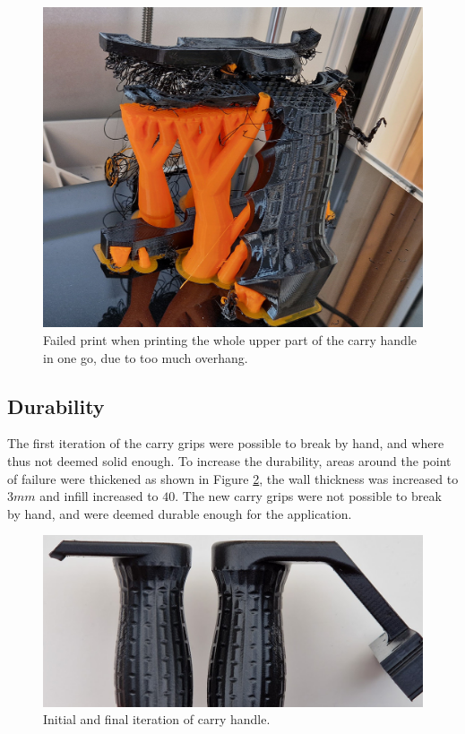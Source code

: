 \begin{figure}[H]
    \centering
    \includegraphics[width=.6\textwidth]{figures/3d_print/failed.jpg}
    \caption{Failed print when printing the whole upper part of the carry handle in one go, due to too much overhang.}
    \label{fig:handle_fail}
\end{figure}


\subsection{Durability}
The first iteration of the carry grips were possible to break by hand, and where thus not deemed solid enough.
To increase the durability, areas around the point of failure were thickened as shown in Figure \ref{fig:handle_thickness}, the wall thickness was increased to $3mm$ and infill increased to $40$.
The new carry grips were not possible to break by hand, and were deemed durable enough for the application.

\begin{figure}[H]
    \centering
    \includegraphics[width=.6\textwidth]{figures/3d_print/thickness.png}
    \caption{Initial and final iteration of carry handle.}
    \label{fig:handle_thickness}
\end{figure}


